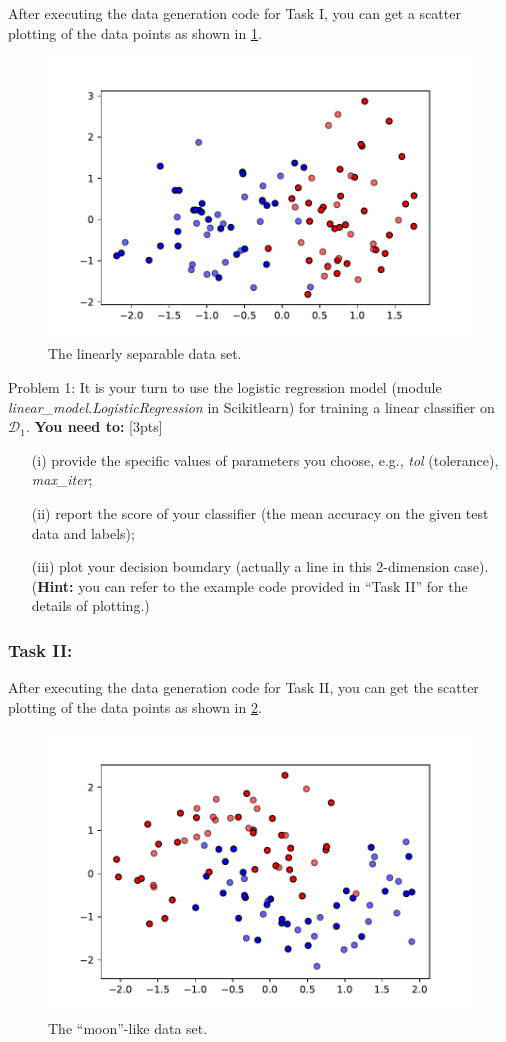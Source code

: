 \documentclass[10pt]{article}
\begin{document}
After executing the data generation code for Task I, you can get a scatter plotting of the data points as shown in \ref{fig.fig1}.
\begin{figure}[h!]
	\centering
	\includegraphics[width=0.7\linewidth]{fig1}
	\caption{The linearly separable data set.}
	\label{fig.fig1}
\end{figure}

{\color{red}Problem 1:} It is your turn to use the logistic regression model (module \emph{linear\_model.LogisticRegression} in Scikitlearn) for training a linear classifier on $\mathcal{D}_1$. \textbf{You need to:} {\color{red}[3pts]}
\begin{enumerate}
	\item[(i)] provide the specific values of parameters you choose, e.g., \emph{tol} (tolerance), \emph{max\_iter};
	\item[(ii)] report the score of your classifier (the mean accuracy on the given test data and labels);
	\item[(iii)] plot your decision boundary (actually a line in this 2-dimension case). \\
	(\textbf{Hint:} you can refer to the example code provided in ``Task II'' for the details of plotting.)
	
\end{enumerate}


\subsubsection{Task II:}
After executing the data generation code for Task II, you can  get the scatter plotting of the data points as shown in \ref{fig.fig2}.

\begin{figure}[H]
	\centering
	\includegraphics[width=0.7\linewidth]{fig2}
	\caption{The ``moon''-like data set.}
	\label{fig.fig2}
\end{figure}
\end{document}
